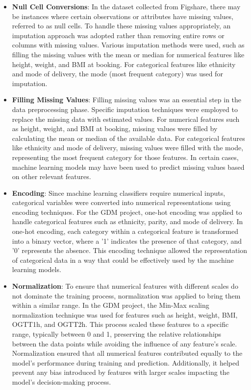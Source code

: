 \documentclass[conference,compsoc]{IEEEtran}
\begin{document}
\begin{itemize}

    \item \textbf{Null Cell Conversions}: In the dataset collected from Figshare, there may be instances where certain observations or attributes have missing values, referred to as null cells. To handle these missing values appropriately, an imputation approach was adopted rather than removing entire rows or columns with missing values. Various imputation methods were used, such as filling the missing values with the mean or median for numerical features like height, weight, and BMI at booking. For categorical features like ethnicity and mode of delivery, the mode (most frequent category) was used for imputation.\\

    \item \textbf{Filling Missing Values}: Filling missing values was an essential step in the data preprocessing phase. Specific imputation techniques were employed to replace the missing data with estimated values. For numerical features such as height, weight, and BMI at booking, missing values were filled by calculating the mean or median of the available data. For categorical features like ethnicity and mode of delivery, missing values were filled with the mode, representing the most frequent category for those features. In certain cases, machine learning models may have been used to predict missing values based on other relevant features.\\

    \item \textbf{Encoding}: Since machine learning classifiers require numerical inputs, categorical variables were converted into numerical representations using encoding techniques. For the GDM project, one-hot encoding was applied to handle categorical features such as ethnicity, parity, and mode of delivery. In one-hot encoding, each category within a categorical feature is transformed into a binary vector, where a '1' indicates the presence of that category, and '0' represents the absence. This encoding technique allowed the representation of categorical data in a way that could be effectively used by the machine learning models.\\

    \item \textbf{Normalization}: To ensure that numerical features with different scales do not dominate the training process, normalization was applied to bring them within a similar range. In the GDM project, the Min-Max scaling normalization technique was used for features such as height, weight, BMI, OGTT1h, and OGTT2h. This process scaled these features to a specific range, typically between 0 and 1, preserving the relative relationships between the data points while avoiding the influence of any feature's scale. Normalization ensured that all numerical features contributed equally to the model's performance during training and prediction. Additionally, it helped prevent any bias introduced by features with larger scales impacting the model's decision-making process.

\end{itemize}
\end{document}
